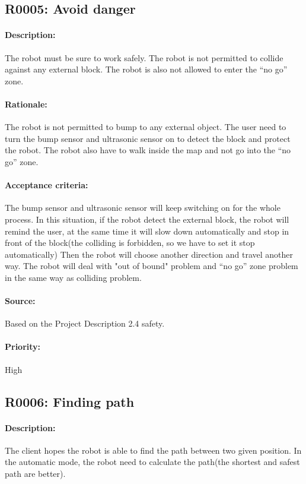 \documentclass[11pt, a4paper]{report}
\begin{document}
\subsection{R0005: Avoid danger}
\paragraph{Description:}
The robot must be sure to work safely. The robot is not permitted to collide against any external block. The robot is also not allowed to enter the “no go” zone.

\paragraph{Rationale:}
The robot is not permitted to bump to any external object. The user need to turn the bump sensor and ultrasonic sensor on to detect the block and protect the robot. The robot also have to walk inside the map and not go into the “no go” zone.  

\paragraph{Acceptance criteria:}
The bump sensor and ultrasonic sensor will keep switching on for the whole process. In this situation, if the robot detect the external block, the robot will remind the user, at the same time it will slow down automatically and stop in front of the block(the colliding is forbidden, so we have to set it stop automatically) Then the robot will choose another direction and travel another way. The robot will deal with "out of bound" problem and “no go” zone problem in the same way as colliding problem.
\paragraph{Source:}
Based on the Project Description 2.4 safety.  
\paragraph{Priority:}
High


\subsection{R0006: Finding path }
\paragraph{Description:}
The client hopes the robot is able to find the path between two given position. In the automatic mode, the robot need to calculate the path(the shortest and safest path are better).    
\end{document}
